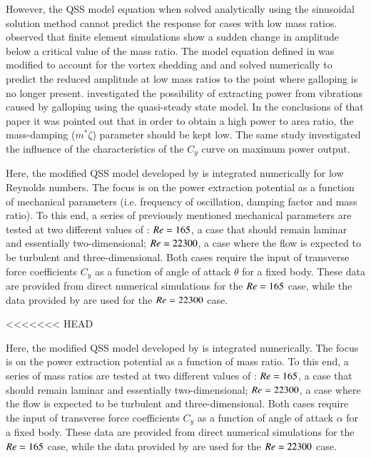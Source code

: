 However, the QSS model equation when solved analytically using the sinusoidal solution method cannot predict the response for cases with low mass ratios. \citet{Joly2012} observed that finite element simulations show a sudden change in amplitude below a critical value of the mass ratio. The model equation defined in \citet{Parkinson1964} was modified to account for the vortex shedding and and solved numerically to predict the reduced amplitude at low mass ratios to the point where galloping is no longer present. \citet{Barrero-Gil2010a} investigated the possibility of extracting power from vibrations caused by galloping using the quasi-steady state model. In the conclusions of that paper it was pointed out that in order to obtain a high power to area ratio, the mass-damping ($m^*\zeta$) parameter should be kept low. The same study investigated the influence of the characteristics of the $C_y$ curve on maximum power output.

Here, the modified QSS model developed by \citet{Joly2012} is integrated numerically for low Reynolds numbers. The focus is on the power extraction potential as a function of mechanical parameters (i.e. frequency of oscillation, damping factor and mass ratio). To this end, a series of previously mentioned mechanical parameters are tested at two different values of \reynoldsnumber: $Re = 165$, a case that should remain laminar and essentially two-dimensional; $Re = 22300$, a case where the flow is expected to be turbulent and three-dimensional. Both cases require the input of transverse force coefficients $C_y$ as a function of angle of attack $\theta$ for a fixed body. These data are provided from direct numerical simulations for the $Re = 165$ case, while the data provided by \citet{Parkinson1964} are used for the $Re = 22300$ case.

<<<<<<< HEAD

Here, the modified QSS model developed by \citet{Joly2012} is integrated numerically. The focus is on the power extraction potential as a function of mass ratio. To this end, a series of mass ratios are tested at two different values of \reynoldsnumber: $Re = 165$, a case that should remain laminar and essentially two-dimensional; $Re = 22300$, a case where the flow is expected to be turbulent and three-dimensional. Both cases require the input of transverse force coefficients $C_y$ as a function of angle of attack $\alpha$ for a fixed body. These data are provided from direct numerical simulations for the $Re = 165$ case, while the data provided by \citet{Parkinson1964} are used for the $Re = 22300$ case.

